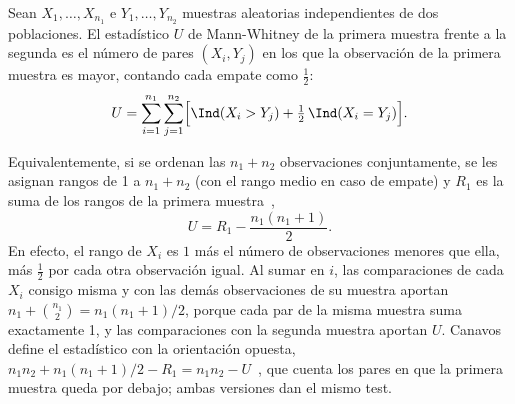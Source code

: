 \begin{definicion}\label{def:estadistico-u}
Sean $X_1, \dots, X_{n_1}$ e $Y_1, \dots, Y_{n_2}$ muestras aleatorias independientes de dos poblaciones. El estadístico $U$ de Mann-Whitney de la primera muestra frente a la segunda es el número de pares $(X_i, Y_j)$ en los que la observación de la primera muestra es mayor, contando cada empate como $\tfrac{1}{2}$:
\[
  U = \sum_{i=1}^{n_1} \sum_{j=1}^{n_2} \Bigl[\Ind(X_i > Y_j) + \tfrac{1}{2}\,\Ind(X_i = Y_j)\Bigr].
\]
\end{definicion}

Equivalentemente, si se ordenan las $n_1 + n_2$ observaciones conjuntamente, se les asignan rangos de 1 a $n_1 + n_2$ (con el rango medio en caso de empate) y $R_1$ es la suma de los rangos de la primera muestra~\cite[sec.~15.2.1]{canavos2003},
\[
  U = R_1 - \frac{n_1(n_1 + 1)}{2}.
\]
En efecto, el rango de $X_i$ es $1$ más el número de observaciones menores que ella, más $\tfrac{1}{2}$ por cada otra observación igual. Al sumar en $i$, las comparaciones de cada $X_i$ consigo misma y con las demás observaciones de su muestra aportan $n_1 + \binom{n_1}{2} = n_1(n_1+1)/2$, porque cada par de la misma muestra suma exactamente 1, y las comparaciones con la segunda muestra aportan $U$. Canavos define el estadístico con la orientación opuesta, $n_1 n_2 + n_1(n_1+1)/2 - R_1 = n_1 n_2 - U$~\cite[ec.~(15.2)]{canavos2003}, que cuenta los pares en que la primera muestra queda por debajo; ambas versiones dan el mismo test.

